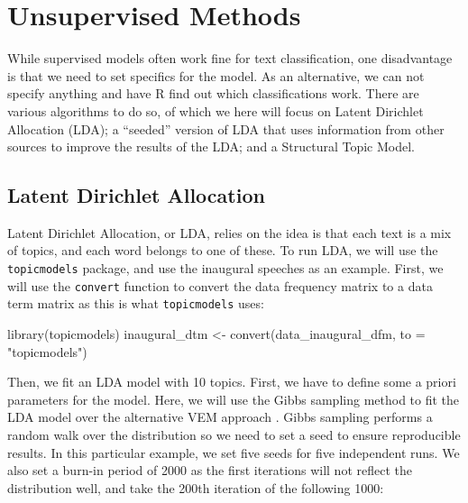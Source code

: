 \documentclass[
]{article}
\newenvironment{Shaded}{\begin{snugshade}}{\end{snugshade}}
\newcommand{\AttributeTok}[1]{\textcolor[rgb]{0.77,0.63,0.00}{#1}}
\newcommand{\FunctionTok}[1]{\textcolor[rgb]{0.00,0.00,0.00}{#1}}
\newcommand{\NormalTok}[1]{#1}
\newcommand{\OtherTok}[1]{\textcolor[rgb]{0.56,0.35,0.01}{#1}}
\newcommand{\StringTok}[1]{\textcolor[rgb]{0.31,0.60,0.02}{#1}}
\begin{document}
\hypertarget{unsupervised-methods}{%
\section{Unsupervised Methods}\label{unsupervised-methods}}

While supervised models often work fine for text classification, one disadvantage is that we need to set specifics for the model. As an alternative, we can not specify anything and have R find out which classifications work. There are various algorithms to do so, of which we here will focus on Latent Dirichlet Allocation (LDA); a ``seeded'' version of LDA that uses information from other sources to improve the results of the LDA; and a Structural Topic Model.

\hypertarget{latent-dirichlet-allocation}{%
\subsection{Latent Dirichlet Allocation}\label{latent-dirichlet-allocation}}

Latent Dirichlet Allocation, or LDA, relies on the idea is that each text is a mix of topics, and each word belongs to one of these. To run LDA, we will use the \texttt{topicmodels} package, and use the inaugural speeches as an example. First, we will use the \texttt{convert} function to convert the data frequency matrix to a data term matrix as this is what \texttt{topicmodels} uses:

\begin{Shaded}
\begin{Highlighting}[]
\FunctionTok{library}\NormalTok{(topicmodels)}
\NormalTok{inaugural\_dtm }\OtherTok{\textless{}{-}} \FunctionTok{convert}\NormalTok{(data\_inaugural\_dfm, }\AttributeTok{to =} \StringTok{"topicmodels"}\NormalTok{)}
\end{Highlighting}
\end{Shaded}

Then, we fit an LDA model with 10 topics. First, we have to define some a priori parameters for the model. Here, we will use the Gibbs sampling method to fit the LDA model \autocite{Griffiths2004a} over the alternative VEM approach \autocite{Blei2003a}. Gibbs sampling performs a random walk over the distribution so we need to set a seed to ensure reproducible results. In this particular example, we set five seeds for five independent runs. We also set a burn-in period of 2000 as the first iterations will not reflect the distribution well, and take the 200th iteration of the following 1000:
\end{document}
